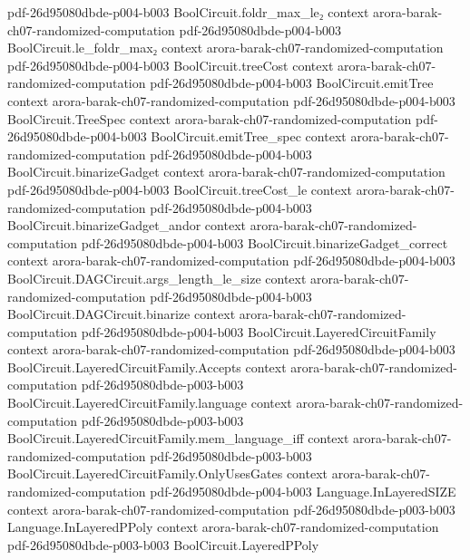 \begin{theorem}
  {pdf-26d95080dbde-p004-b003}
\proofstep
  {BoolCircuit.foldr_max_le₂}
  {context}
  {arora-barak-ch07-randomized-computation}
  {pdf-26d95080dbde-p004-b003}
\proofstep
  {BoolCircuit.le_foldr_max₂}
  {context}
  {arora-barak-ch07-randomized-computation}
  {pdf-26d95080dbde-p004-b003}
\proofstep
  {BoolCircuit.treeCost}
  {context}
  {arora-barak-ch07-randomized-computation}
  {pdf-26d95080dbde-p004-b003}
\proofstep
  {BoolCircuit.emitTree}
  {context}
  {arora-barak-ch07-randomized-computation}
  {pdf-26d95080dbde-p004-b003}
\proofstep
  {BoolCircuit.TreeSpec}
  {context}
  {arora-barak-ch07-randomized-computation}
  {pdf-26d95080dbde-p004-b003}
\proofstep
  {BoolCircuit.emitTree_spec}
  {context}
  {arora-barak-ch07-randomized-computation}
  {pdf-26d95080dbde-p004-b003}
\proofstep
  {BoolCircuit.binarizeGadget}
  {context}
  {arora-barak-ch07-randomized-computation}
  {pdf-26d95080dbde-p004-b003}
\proofstep
  {BoolCircuit.treeCost_le}
  {context}
  {arora-barak-ch07-randomized-computation}
  {pdf-26d95080dbde-p004-b003}
\proofstep
  {BoolCircuit.binarizeGadget_andor}
  {context}
  {arora-barak-ch07-randomized-computation}
  {pdf-26d95080dbde-p004-b003}
\proofstep
  {BoolCircuit.binarizeGadget_correct}
  {context}
  {arora-barak-ch07-randomized-computation}
  {pdf-26d95080dbde-p004-b003}
\proofstep
  {BoolCircuit.DAGCircuit.args_length_le_size}
  {context}
  {arora-barak-ch07-randomized-computation}
  {pdf-26d95080dbde-p004-b003}
\proofstep
  {BoolCircuit.DAGCircuit.binarize}
  {context}
  {arora-barak-ch07-randomized-computation}
  {pdf-26d95080dbde-p004-b003}
\proofstep
  {BoolCircuit.LayeredCircuitFamily}
  {context}
  {arora-barak-ch07-randomized-computation}
  {pdf-26d95080dbde-p004-b003}
\proofstep
  {BoolCircuit.LayeredCircuitFamily.Accepts}
  {context}
  {arora-barak-ch07-randomized-computation}
  {pdf-26d95080dbde-p003-b003}
\proofstep
  {BoolCircuit.LayeredCircuitFamily.language}
  {context}
  {arora-barak-ch07-randomized-computation}
  {pdf-26d95080dbde-p003-b003}
\proofstep
  {BoolCircuit.LayeredCircuitFamily.mem_language_iff}
  {context}
  {arora-barak-ch07-randomized-computation}
  {pdf-26d95080dbde-p003-b003}
\proofstep
  {BoolCircuit.LayeredCircuitFamily.OnlyUsesGates}
  {context}
  {arora-barak-ch07-randomized-computation}
  {pdf-26d95080dbde-p004-b003}
\proofstep
  {Language.InLayeredSIZE}
  {context}
  {arora-barak-ch07-randomized-computation}
  {pdf-26d95080dbde-p003-b003}
\proofstep
  {Language.InLayeredPPoly}
  {context}
  {arora-barak-ch07-randomized-computation}
  {pdf-26d95080dbde-p003-b003}
\proofstep
  {BoolCircuit.LayeredPPoly}

\end{theorem}

